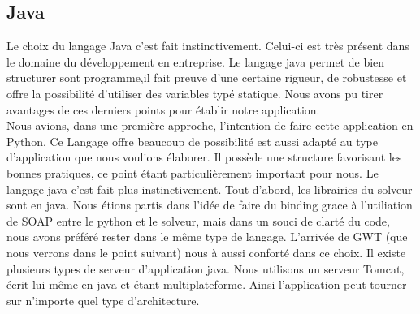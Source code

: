 
\subsection{Java}
Le choix du langage Java c'est fait instinctivement. Celui-ci est très présent
dans le domaine du développement en entreprise. Le langage java permet de bien
structurer sont programme,il fait preuve d'une certaine rigueur, de robustesse
et offre la possibilité d'utiliser des variables typé statique. Nous avons pu
tirer avantages de ces derniers points pour établir notre application.\\
Nous avions, dans une première approche, l'intention de faire cette
application en Python. Ce Langage offre beaucoup de possibilité est aussi adapté
au type d'application que nous voulions élaborer. Il possède une structure
favorisant les bonnes pratiques, ce point étant particulièrement important pour
nous. Le langage java c'est fait plus instinctivement. Tout d'abord, les
librairies du solveur sont en java. Nous étions partis dans l'idée de faire du
binding grace à l'utiliation de SOAP entre le python et le solveur, mais
dans un souci de clarté du code, nous avons préféré rester dans le même type de
langage. L'arrivée de GWT (que nous verrons dans le point suivant) nous à aussi
conforté dans ce choix.
Il existe plusieurs types de serveur d'application java. Nous utilisons un
serveur Tomcat, écrit lui-même en java et étant multiplateforme. Ainsi
l'application peut tourner sur n'importe quel type d'architecture.




